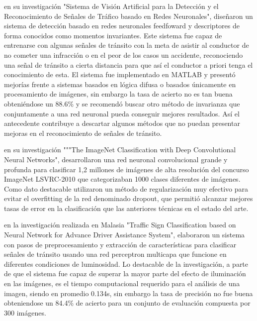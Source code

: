 		\citep{Rocha2010} en su investigación "Sistema de Visión Artificial para la Detección y el Reconocimiento de Señales de Tráfico basado en Redes Neuronales", diseñaron un sistema de detección basado en redes neuronales feedfoward y descriptores de forma conocidos como momentos invariantes. Este sistema fue capaz de entrenarse con algunas señales de tránsito con la meta de asistir al conductor de no cometer una infracción o en el peor de los casos un accidente, reconociendo una señal de tránsito a cierta distancia para que así el conductor a priori tenga el conocimiento de esta. El sistema fue implementado en MATLAB y presentó mejorías frente a sistemas basados en lógica difusa o basados únicamente en procesamiento de imágenes, sin embargo la tasa de acierto no es tan buena obteniéndose un 88.6\% y se recomendó buscar otro método de invarianza que conjuntamente a una red neuronal pueda conseguir mejores resultados. Así el antecedente contribuye a descartar algunos métodos que no puedan presentar mejoras en el reconocimiento de señales de tránsito.
		\vskip 0.4cm

		\citep{Krizhevsky2012} en su investigación """The ImageNet Classification with Deep Convolutional Neural Networks", desarrollaron una red neuronal convolucional grande y profunda para clasificar 1,2 millones de imágenes de alta resolución del concurso ImageNet LSVRC-2010 que categorizaban 1000 clases diferentes de imágenes. Como dato destacable utilizaron un método de regularización muy efectivo para evitar el overfitting de la red denominado dropout, que permitió alcanzar mejores tasas de error en la clasificación que las anteriores técnicas en el estado del arte.
		\vskip 0.4cm	

		\citep{Hannan2014} en la investigación realizada en Malasia "Traffic Sign Classification based on Neural Network for Advance Driver Assistance System", elaboraron un sistema con pasos de preprocesamiento y extracción de características para clasificar señales de tránsito usando una red perceptron multicapa que funcione en diferentes condiciones de luminosidad. Lo destacable de la investigación, a parte de que el sistema fue capaz de superar la mayor parte del efecto de iluminación en las imágenes, es el tiempo computacional requerido para el análisis de una imagen, siendo en promedio 0.134s, sin embargo la tasa de precisión no fue buena obteniendose un 84.4\% de acierto para un conjunto de evaluación compuesta por 300 imágenes. 
		\vskip 0.4cm	

